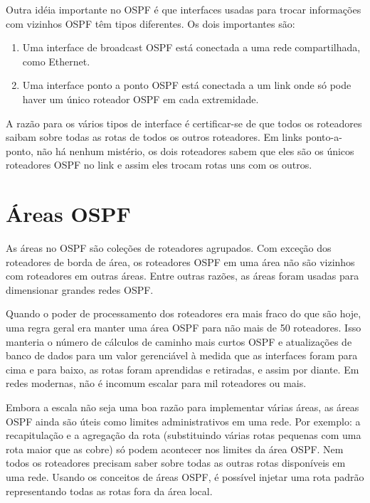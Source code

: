 \documentclass[12pt,a4paper]{report}
\begin{document}
Outra id\'eia importante no OSPF \'e que interfaces usadas para trocar informa\c{c}\~oes com vizinhos OSPF t\^em tipos diferentes. Os dois importantes s\~ao:

\begin{enumerate}
\item Uma interface de broadcast OSPF est\'a conectada a uma rede compartilhada, como Ethernet.
\item Uma interface ponto a ponto OSPF est\'a conectada a um link onde s\'o pode haver um \'unico roteador OSPF em cada extremidade.
\end{enumerate}

A raz\~ao para os v\'arios tipos de interface \'e certificar-se de que todos os roteadores saibam sobre todas as rotas de todos os outros roteadores. Em links ponto-a-ponto, n\~ao h\'a nenhum mist\'erio, os dois roteadores sabem que eles s\~ao os \'unicos roteadores OSPF no link e assim eles trocam rotas uns com os outros\cite{rfc2328}.

\section{\'Areas OSPF}

As \'areas no OSPF s\~ao cole\c{c}\~oes de roteadores agrupados. Com exce\c{c}\~ao dos roteadores de borda de \'area, os roteadores OSPF em uma \'area n\~ao s\~ao vizinhos com roteadores em outras \'areas. Entre outras raz\~oes, as \'areas foram usadas para dimensionar grandes redes OSPF. 

Quando o poder de processamento dos roteadores era mais fraco do que s\~ao hoje, uma regra geral era manter uma \'area OSPF para n\~ao mais de 50 roteadores. Isso manteria o n\'umero de c\'alculos de caminho mais curtos OSPF e atualiza\c{c}\~oes de banco de dados para um valor gerenci\'avel \`a medida que as interfaces foram para cima e para baixo, as rotas foram aprendidas e retiradas, e assim por diante. Em redes modernas, n\~ao \'e incomum escalar para mil roteadores ou mais.

Embora a escala n\~ao seja uma boa raz\~ao para implementar v\'arias \'areas, as \'areas OSPF ainda s\~ao \'uteis como limites administrativos em uma rede. Por exemplo: a recapitula\c{c}\~ao e a agrega\c{c}\~ao da rota (substituindo v\'arias rotas pequenas com uma rota maior que as cobre) s\'o podem acontecer nos limites da \'area OSPF. Nem todos os roteadores precisam saber sobre todas as outras rotas dispon\'iveis em uma rede. Usando os conceitos de \'areas OSPF, \'e poss\'ivel injetar uma rota padr\~ao representando todas as rotas fora da \'area local.
\end{document}
